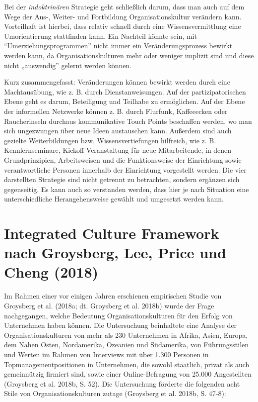\documentclass[
  letterpaper,
]{book}
\begin{document}
Bei der \emph{indoktrinären} Strategie geht schließlich darum, dass man
auch auf dem Wege der Aus-, Weiter- und Fortbildung Organisationskultur
verändern kann. Vorteilhaft ist hierbei, dass relativ schnell durch eine
Wissensvermittlung eine Umorientierung stattfinden kann. Ein Nachteil
könnte sein, mit ``Umerziehungsprogrammen'' nicht immer ein
Veränderungsprozess bewirkt werden kann, da Organisationskulturen mehr
oder weniger implizit sind und diese nicht „auswendig'' gelernt werden
können.

Kurz zusammengefasst: Veränderungen können bewirkt werden durch eine
Machtausübung, wie z. B. durch Dienstanweisungen. Auf der
partizipatorischen Ebene geht es darum, Beteiligung und Teilhabe zu
ermöglichen. Auf der Ebene der informellen Netzwerke können z. B. durch
Flurfunk, Kaffeeecken oder Raucherinseln durchaus kommunikative Touch
Points beschaffen werden, wo man sich ungezwungen über neue Ideen
austauschen kann. Außerdem sind auch gezielte Weiterbildungen bzw.
Wissensvertiefungen hilfreich, wie z. B. Kennlernseminare,
Kickoff-Veranstaltung für neue Mitarbeitende, in denen Grundprinzipien,
Arbeitsweisen und die Funktionsweise der Einrichtung sowie
verantwortliche Personen innerhalb der Einrichtung vorgestellt werden.
Die vier darstellten Strategie sind nicht getrennt zu betrachten,
sondern ergänzen sich gegenseitig. Es kann auch so verstanden werden,
dass hier je nach Situation eine unterschiedliche Herangehensweise
gewählt und umgesetzt werden kann.

\section{Integrated Culture Framework nach Groysberg, Lee, Price und
Cheng
(2018)}\label{integrated-culture-framework-nach-groysberg-lee-price-und-cheng-2018}

Im Rahmen einer vor einigen Jahren erschienen empirischen Studie von
Groysberg et al. (2018a; dt. Groysberg et al. 2018b) wurde der Frage
nachgegangen, welche Bedeutung Organisationskulturen für den Erfolg von
Unternehmen haben können. Die Untersuchung beinhaltete eine Analyse der
Organisationskulturen von mehr als 230 Unternehmen in Afrika, Asien,
Europa, dem Nahen Osten, Nordamerika, Ozeanien und Südamerika, von
Führungsstilen und Werten im Rahmen von Interviews mit über 1.300
Personen in Topmanagementpositionen in Unternehmen, die sowohl
staatlich, privat als auch gemeinnützig firmiert sind, sowie einer
Online-Befragung von 25.000 Angestellten (Groysberg et al. 2018b, S.
52). Die Untersuchung förderte die folgenden acht Stile von
Organisationskulturen zutage (Groysberg et al. 2018b, S. 47-8):
\end{document}
